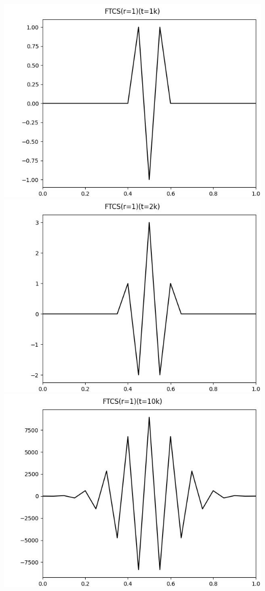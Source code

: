\documentclass[12pt]{ctexart}
\begin{document}
\includegraphics[scale=0.35]{FTCS(r=1)(t=1k).jpg}
\includegraphics[scale=0.35]{FTCS(r=1)(t=2k).jpg}
\includegraphics[scale=0.35]{FTCS(r=1)(t=10k).jpg}
\end{document}

